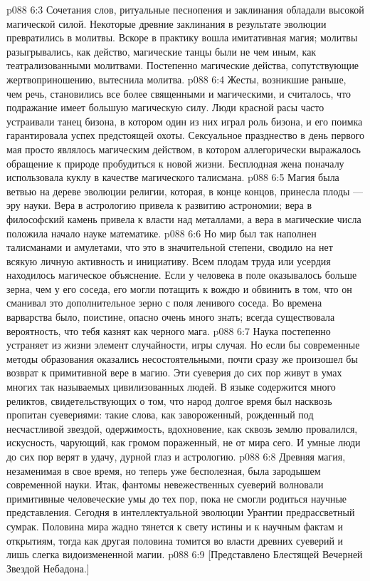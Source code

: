 \vs p088 6:3 Сочетания слов, ритуальные песнопения и заклинания обладали высокой магической силой. Некоторые древние заклинания в результате эволюции превратились в молитвы. Вскоре в практику вошла имитативная магия; молитвы разыгрывались, как действо, магические танцы были не чем иным, как театрализованными молитвами. Постепенно магические действа, сопутствующие жертвоприношению, вытеснила молитва.
\vs p088 6:4 Жесты, возникшие раньше, чем речь, становились все более священными и магическими, и считалось, что подражание имеет большую магическую силу. Люди красной расы часто устраивали танец бизона, в котором один из них играл роль бизона, и его поимка гарантировала успех предстоящей охоты. Сексуальное празднество в день первого мая просто являлось магическим действом, в котором аллегорически выражалось обращение к природе пробудиться к новой жизни. Бесплодная жена поначалу использовала куклу в качестве магического талисмана.
\vs p088 6:5 \pc Магия была ветвью на дереве эволюции религии, которая, в конце концов, принесла плоды --- эру науки. Вера в астрологию привела к развитию астрономии; вера в философский камень привела к власти над металлами, а вера в магические числа положила начало науке математике.
\vs p088 6:6 \pc Но мир был так наполнен талисманами и амулетами, что это в значительной степени, сводило на нет всякую личную активность и инициативу. Всем плодам труда или усердия находилось магическое объяснение. Если у человека в поле оказывалось больше зерна, чем у его соседа, его могли потащить к вождю и обвинить в том, что он сманивал это дополнительное зерно с поля ленивого соседа. Во времена варварства было, поистине, опасно очень много знать; всегда существовала вероятность, что тебя казнят как черного мага.
\vs p088 6:7 Наука постепенно устраняет из жизни элемент случайности, игры случая. Но если бы современные методы образования оказались несостоятельными, почти сразу же произошел бы возврат к примитивной вере в магию. Эти суеверия до сих пор живут в умах многих так называемых цивилизованных людей. В языке содержится много реликтов, свидетельствующих о том, что народ долгое время был насквозь пропитан суевериями: такие слова, как завороженный, рожденный под несчастливой звездой, одержимость, вдохновение, как сквозь землю провалился, искусность, чарующий, как громом пораженный, не от мира сего. И умные люди до сих пор верят в удачу, дурной глаз и астрологию.
\vs p088 6:8 Древняя магия, незаменимая в свое время, но теперь уже бесполезная, была зародышем современной науки. Итак, фантомы невежественных суеверий волновали примитивные человеческие умы до тех пор, пока не смогли родиться научные представления. Сегодня в интеллектуальной эволюции Урантии предрассветный сумрак. Половина мира жадно тянется к свету истины и к научным фактам и открытиям, тогда как другая половина томится во власти древних суеверий и лишь слегка видоизмененной магии.
\vsetoff
\vs p088 6:9 [Представлено Блестящей Вечерней Звездой Небадона.]
